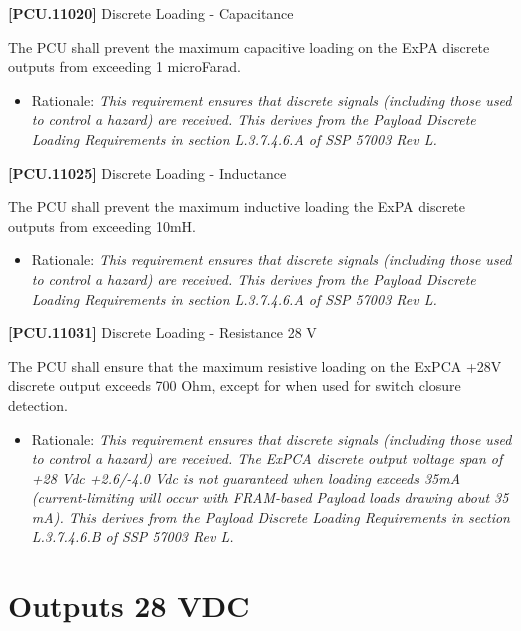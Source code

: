 \documentclass[12pt,oneside,oldfontcommands]{memoir}
\begin{document}
\textbf{[PCU.11020]} Discrete Loading - Capacitance

The \gls{PCU} shall prevent the maximum capacitive loading on the \gls{ExPA} discrete outputs from exceeding 1 microFarad.

\begin{itemize}
\item{} Rationale: \emph{This requirement ensures that discrete signals (including those used to control a hazard) are received. This derives from the Payload Discrete Loading Requirements in section L.3.7.4.6.A of SSP 57003 Rev L.}

\end{itemize}

\textbf{[PCU.11025]} Discrete Loading - Inductance

The \gls{PCU} shall prevent the maximum inductive loading the \gls{ExPA} discrete outputs from exceeding 10mH.

\begin{itemize}
\item{} Rationale: \emph{This requirement ensures that discrete signals (including those used to control a hazard) are received. This derives from the Payload Discrete Loading Requirements in section L.3.7.4.6.A of SSP 57003 Rev L.}

\end{itemize}

\textbf{[PCU.11031]} Discrete Loading - Resistance 28 V

The \gls{PCU} shall ensure that the maximum resistive loading on the ExPCA +28V discrete output exceeds 700 Ohm, except for when used for switch closure detection.

\begin{itemize}
\item{} Rationale: \emph{This requirement ensures that discrete signals (including those used to control a hazard) are received. The ExPCA discrete output voltage span of +28 Vdc +2.6\slash -4.0 Vdc is not guaranteed when loading exceeds 35mA (current-limiting will occur with FRAM-based Payload loads drawing about 35 mA). This derives from the Payload Discrete Loading Requirements in section L.3.7.4.6.B of SSP 57003 Rev L.}

\end{itemize}

\section{Outputs 28 VDC}
\label{outputs28vdc}
\end{document}
